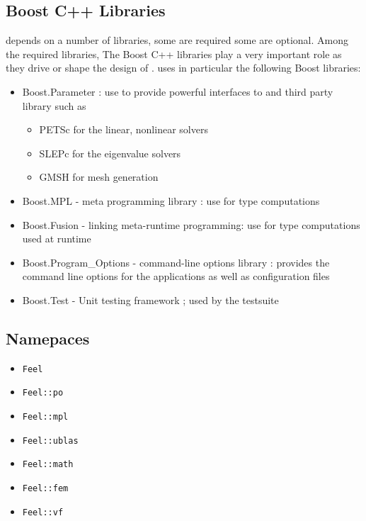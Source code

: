 \subsection{Boost C++ Libraries}
\label{sec:boost-c++-libraries}

\feel depends on a number of libraries, some are required some are optional.
Among the required libraries, The Boost C++ libraries play a very important role
as they drive or shape the  design of \feel. \feel uses in particular the
following Boost libraries:
\begin{itemize}
\item Boost.Parameter : use to provide powerful
  interfaces to \feel and third party library such as
  \begin{itemize}
  \item PETSc  for the linear, nonlinear solvers
  \item SLEPc for the eigenvalue solvers
  \item GMSH for mesh generation
  \end{itemize}
\item Boost.MPL - meta programming library : use for type computations
\item Boost.Fusion - linking meta-runtime programming: use for type computations
  used at runtime
\item Boost.Program\_Options - command-line options library : provides the
  command line options for the \feel applications as well as configuration files
\item Boost.Test - Unit testing framework ; used by the \feel testsuite
\end{itemize}

\subsection{\feel Namepaces}

\begin{itemize}
\item \lstinline!Feel!
\item \lstinline!Feel::po!
\item \lstinline!Feel::mpl!
\item \lstinline!Feel::ublas!
\item \lstinline!Feel::math!
\item \lstinline!Feel::fem!
\item \lstinline!Feel::vf!

\end{itemize}


